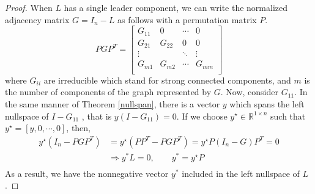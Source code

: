 \documentclass[11pt, a4paper, oneside, openany, reqno]{book}
\theoremstyle{definition}
\theoremstyle{remark}
\numberwithin{equation}{chapter} %
\newcommand{\R}{\ensuremath{{\mathbb R}}}
\begin{document}
\begin{proof}
	When $ L $ has a single leader component,
	we can write the normalized adjacency matrix $ G = I_n - L $
	as follows with a permutation matrix $ P $.
	\begin{equation}
		P G P^T = \left[ \begin{array}{cccc} G_{11} & 0 & \cdots & 0 \\
		G_{21} & G_{22} & 0 & 0 \\
		\vdots &  & \ddots & \vdots \\
		G_{m1} & G_{m2} & \cdots & G_{mm} \\	\end{array} \right]	
	\end{equation}
	where $ G_{ii} $ are irreducible which stand for strong connected components,
	and $ m $ is the number of components of the graph represented by $ G $.
	Now, consider $ G_{11} $. In the same manner of Theorem \ref{nullspan},
	there is a vector $ y $ which spans the left nullspace of $ I-G_{11} $
	, that is $ y(I-G_{11}) =0 $. If we choose $ y^\star \in \R^{1 \times n} $ such that 
	$ y^\star =\left[ y,0,\cdots,0 \right]  $, then,
	\begin{equation}\begin{split}
	y^\star (I_n -PGP^T) &= y^\star ( PP^T -PGP^T)=y^\star P (I_n-G)P^T =0	\\
	&\Rightarrow y^* L =0, \qquad y^* = y^\star P \\
	\end{split}\end{equation}
	As a result, we have the nonnegative vector $ y^* $ included in the left nullspace of $ L $.
\end{proof}
\end{document}
